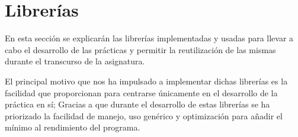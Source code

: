 \section{Librerías}\label{sec:introduction}

En esta sección se explicarán las librerías implementadas y usadas para llevar a cabo el desarrollo de las prácticas y permitir la reutilización de las mismas durante el transcurso de la asignatura.\bigskip

El principal motivo que nos ha impulsado a implementar dichas librerías es la facilidad que proporcionan para centrarse únicamente en el desarrollo de la práctica en sí; Gracias a que durante el desarrollo de estas librerías se ha priorizado la facilidad de manejo, uso genérico y optimización para añadir el mínimo  al rendimiento del programa.



